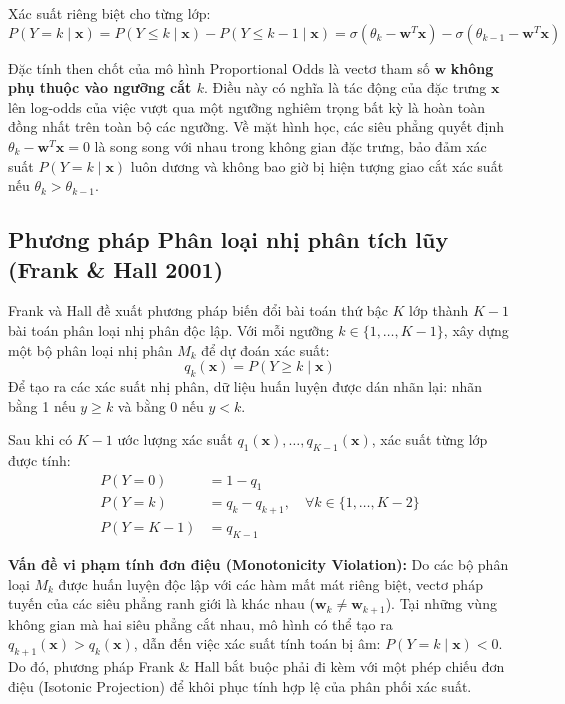 Xác suất riêng biệt cho từng lớp:
\begin{equation}
    P(Y = k \mid \mathbf{x}) = P(Y \le k \mid \mathbf{x}) - P(Y \le k-1 \mid \mathbf{x}) = \sigma(\theta_k - \mathbf{w}^T \mathbf{x}) - \sigma(\theta_{k-1} - \mathbf{w}^T \mathbf{x})
\end{equation}

Đặc tính then chốt của mô hình Proportional Odds là vectơ tham số $\mathbf{w}$ \textbf{không phụ thuộc vào ngưỡng cắt $k$}. Điều này có nghĩa là tác động của đặc trưng $\mathbf{x}$ lên log-odds của việc vượt qua một ngưỡng nghiêm trọng bất kỳ là hoàn toàn đồng nhất trên toàn bộ các ngưỡng. Về mặt hình học, các siêu phẳng quyết định $\theta_k - \mathbf{w}^T \mathbf{x} = 0$ là song song với nhau trong không gian đặc trưng, bảo đảm xác suất $P(Y = k \mid \mathbf{x})$ luôn dương và không bao giờ bị hiện tượng giao cắt xác suất nếu $\theta_k > \theta_{k-1}$.

\subsection{Phương pháp Phân loại nhị phân tích lũy (Frank \& Hall 2001)}
Frank và Hall \cite{frank2001simple} đề xuất phương pháp biến đổi bài toán thứ bậc $K$ lớp thành $K-1$ bài toán phân loại nhị phân độc lập. Với mỗi ngưỡng $k \in \{1, \dots, K-1\}$, xây dựng một bộ phân loại nhị phân $M_k$ để dự đoán xác suất:
\begin{equation}
    q_k(\mathbf{x}) = P(Y \ge k \mid \mathbf{x})
\end{equation}
Để tạo ra các xác suất nhị phân, dữ liệu huấn luyện được dán nhãn lại: nhãn bằng 1 nếu $y \ge k$ và bằng 0 nếu $y < k$.

Sau khi có $K-1$ ước lượng xác suất $q_1(\mathbf{x}), \dots, q_{K-1}(\mathbf{x})$, xác suất từng lớp được tính:
\begin{align}
    P(Y = 0) &= 1 - q_1 \\
    P(Y = k) &= q_k - q_{k+1}, \quad \forall k \in \{1, \dots, K-2\} \\
    P(Y = K-1) &= q_{K-1}
\end{align}

\textbf{Vấn đề vi phạm tính đơn điệu (Monotonicity Violation):} Do các bộ phân loại $M_k$ được huấn luyện độc lập với các hàm mất mát riêng biệt, vectơ pháp tuyến của các siêu phẳng ranh giới là khác nhau ($\mathbf{w}_k \ne \mathbf{w}_{k+1}$). Tại những vùng không gian mà hai siêu phẳng cắt nhau, mô hình có thể tạo ra $q_{k+1}(\mathbf{x}) > q_k(\mathbf{x})$, dẫn đến việc xác suất tính toán bị âm: $P(Y = k \mid \mathbf{x}) < 0$. Do đó, phương pháp Frank \& Hall bắt buộc phải đi kèm với một phép chiếu đơn điệu (Isotonic Projection) để khôi phục tính hợp lệ của phân phối xác suất.

